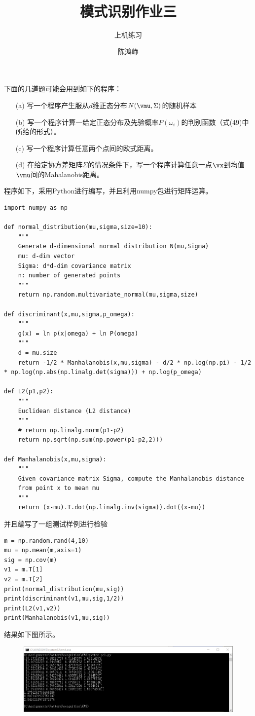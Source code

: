 \documentclass[reportComp]{thesis}
\title{模式识别作业三}
\subtitle{上机练习}
\author{陈鸿峥}
\begin{document}
\maketitle

\begin{question}[\textsection 2.5 Q1]
下面的几道题可能会用到如下的程序：
\begin{itemize}
	\item [(a)] 写一个程序产生服从$d$维正态分布$N(\vmu,\Sigma)$的随机样本
	\item [(b)] 写一个程序计算一给定正态分布及先验概率$P(\omega_i)$的判别函数（式(49)中所给的形式）。
	\item [(c)] 写一个程序计算任意两个点间的欧式距离。
	\item [(d)] 在给定协方差矩阵$\Sigma$的情况条件下，写一个程序计算任意一点$\vx$到均值$\vmu$间的Mahalanobis距离。
\end{itemize}
\end{question}
\begin{answer}
程序如下，采用Python进行编写，并且利用numpy包进行矩阵运算。
\begin{lstlisting}
import numpy as np

def normal_distribution(mu,sigma,size=10):
	"""
	Generate d-dimensional normal distribution N(mu,Sigma)
	mu: d-dim vector
	Sigma: d*d-dim covariance matrix
	n: number of generated points
	"""
	return np.random.multivariate_normal(mu,sigma,size)

def discriminant(x,mu,sigma,p_omega):
	"""
	g(x) = ln p(x|omega) + ln P(omega)
	"""
	d = mu.size
	return -1/2 * Manhalanobis(x,mu,sigma) - d/2 * np.log(np.pi) - 1/2 * np.log(np.abs(np.linalg.det(sigma))) + np.log(p_omega)

def L2(p1,p2):
	"""
	Euclidean distance (L2 distance)
	"""
	# return np.linalg.norm(p1-p2)
	return np.sqrt(np.sum(np.power(p1-p2,2)))

def Manhalanobis(x,mu,sigma):
	"""
	Given covariance matrix Sigma, compute the Manhalanobis distance
	from point x to mean mu
	"""
	return (x-mu).T.dot(np.linalg.inv(sigma)).dot((x-mu))
\end{lstlisting}

并且编写了一组测试样例进行检验
\begin{lstlisting}
m = np.random.rand(4,10)
mu = np.mean(m,axis=1)
sig = np.cov(m)
v1 = m.T[1]
v2 = m.T[2]
print(normal_distribution(mu,sig))
print(discriminant(v1,mu,sig,1/2))
print(L2(v1,v2))
print(Manhalanobis(v1,mu,sig))
\end{lstlisting}

结果如下图所示。
\begin{figure}[H]
\centering
\includegraphics[width=\linewidth]{result.png}
\end{figure}
\end{answer}
\end{document}
